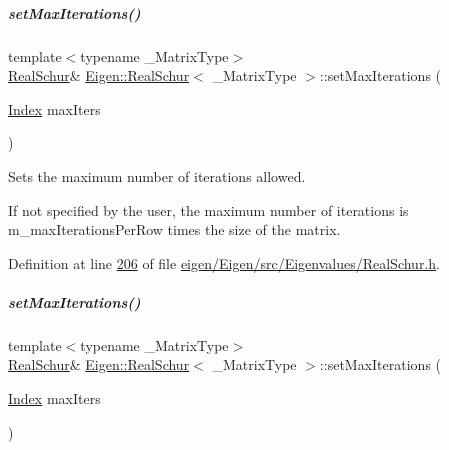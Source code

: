 \mbox{\label{group___eigenvalues___module_ad189e8776ee20a12046694f98b354322}} 
\subparagraph{\texorpdfstring{set\+Max\+Iterations()}{setMaxIterations()}\hspace{0.1cm}{\footnotesize\ttfamily [1/2]}}
{\footnotesize\ttfamily template$<$typename \+\_\+\+Matrix\+Type$>$ \\
\hyperlink{group___eigenvalues___module_class_eigen_1_1_real_schur}{Real\+Schur}\& \hyperlink{group___eigenvalues___module_class_eigen_1_1_real_schur}{Eigen\+::\+Real\+Schur}$<$ \+\_\+\+Matrix\+Type $>$\+::set\+Max\+Iterations (\begin{DoxyParamCaption}\item[{\hyperlink{group___eigenvalues___module_a8bd4653e2d9569a44ecc95e746422d3f}{Index}}]{max\+Iters }\end{DoxyParamCaption})\hspace{0.3cm}{\ttfamily [inline]}}



Sets the maximum number of iterations allowed. 

If not specified by the user, the maximum number of iterations is m\+\_\+max\+Iterations\+Per\+Row times the size of the matrix. 

Definition at line \hyperlink{eigen_2_eigen_2src_2_eigenvalues_2_real_schur_8h_source_l00206}{206} of file \hyperlink{eigen_2_eigen_2src_2_eigenvalues_2_real_schur_8h_source}{eigen/\+Eigen/src/\+Eigenvalues/\+Real\+Schur.\+h}.

\mbox{\label{group___eigenvalues___module_ad189e8776ee20a12046694f98b354322}} 
\subparagraph{\texorpdfstring{set\+Max\+Iterations()}{setMaxIterations()}\hspace{0.1cm}{\footnotesize\ttfamily [2/2]}}
{\footnotesize\ttfamily template$<$typename \+\_\+\+Matrix\+Type$>$ \\
\hyperlink{group___eigenvalues___module_class_eigen_1_1_real_schur}{Real\+Schur}\& \hyperlink{group___eigenvalues___module_class_eigen_1_1_real_schur}{Eigen\+::\+Real\+Schur}$<$ \+\_\+\+Matrix\+Type $>$\+::set\+Max\+Iterations (\begin{DoxyParamCaption}\item[{\hyperlink{group___eigenvalues___module_a8bd4653e2d9569a44ecc95e746422d3f}{Index}}]{max\+Iters }\end{DoxyParamCaption})\hspace{0.3cm}{\ttfamily [inline]}}



